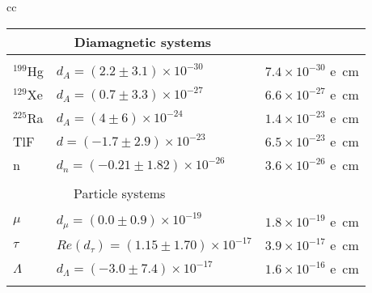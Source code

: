 {\begin{table}
{\begin{center}
\begin{tabular}{cc}
\begin{tabular}{lll}
& $\quad $ Diamagnetic systems & \\ \hline
\\
$^{199}$Hg & $d_A =(2.2 \pm 3.1) \times 10^{-30}$& 
$7.4 \times 10^{-30}$ 
e\, cm\\
$^{129}$Xe & $d_A =(0.7 \pm 3.3) \times 10^{-27}$& 
$6.6 \times 10^{-27}$ e\, cm\\
$^{225}$Ra & $d_A =(4 \pm 6) \times 10^{-24}$& 
$1.4 \times 10^{-23}$ e\, cm\\
TlF & $d =(-1.7 \pm 2.9) \times 10^{-23}$& 
$6.5 \times 10^{-23}$ e\, cm\\
n& $d_n =(-0.21 \pm 1.82) \times 10^{-26}$&
$3.6 \times 10^{-26}$ e\, cm\\
\hline
\vspace*{1.5mm}\\
&  $\quad $ Particle systems& \\
\hline
\\
$\mu$ & $d_{\mu} =(0.0 \pm 0.9) \times 10^{-19}$&
$1.8 \times 10^{-19}$ e\, cm\\
$\tau$ & $Re(d_{\tau}) =(1.15 \pm 1.70) \times 10^{-17}$&
$3.9 \times 10^{-17}$
e\, cm\\
$\Lambda$ & $d_{\Lambda} =(-3.0 \pm 7.4) \times 10^{-17}$&
$1.6 \times 10^{-16}$
e\, cm\\
& \\
\hline\hline
 \end{tabular}
 \end{tabular}
\end{center}}
\end{table}
}


